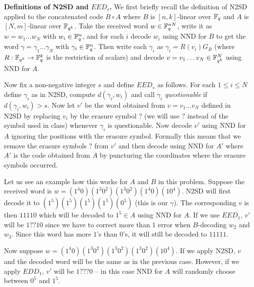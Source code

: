 \documentclass[12pt]{amsart}
\begin{document}
{\bf Definitions of N2SD and $EED_s$.} We first briefly recall the definition of N2SD applied to the concatenated code $B\circ A$ where $B$ is $[n,k]$-linear over ${\mathbb F}_q$
and $A$ is $[N,m]$-linear over ${\mathbb F}_{q^k}$. Take the received word $w\in {\mathbb F}_{q}^{nN}$, write it as $w=w_1\ldots w_N$ with 
$w_i\in {\mathbb F}_{q}^{n}$, and for each $i$ decode $w_i$ using NND for $B$ to get the word $\gamma=\gamma_1\ldots\gamma_N$
with $\gamma_i\in {\mathbb F}_{q}^{n}$. Then write each $\gamma_i$ as $\gamma_i=R(v_i)G_B$ (where $R:{\mathbb F}_{q^k}\to {\mathbb F}_{q}^k$ is the restriction of scalars) and decode $v=v_1\ldots v_N\in {\mathbb F}_{q^k}^N$ using NND for $A$.
\skv

Now fix a non-negative integer $s$ and define $EED_s$ as follows. For each $1\leq i\leq N$ define $\gamma_i$ as in N2SD,
compute $d(\gamma_i,w_i)$ and call $\gamma_i$ {\it questionable} if $d(\gamma_i,w_i)>s$. Now let $v'$ be the word obtained
from $v=v_1\ldots v_N$ defined in N2SD by replacing $v_i$ by the erasure symbol $?$ (we will use $?$ instead of the symbol used in class) whenever $\gamma_i$ is questionable. Now decode $v'$ using NND for $A$ ignoring the positions with the erasure symbol. Formally this means that we remove the erasure symbols $?$ from $v'$ and then decode using NND for $A'$ where $A'$ is the code
obtained from $A$ by puncturing the coordinates where the erasure symbols occurred.
\skv

Let us see an example how this works for $A$ and $B$ in this problem. Suppose the received word is 
$w=(1^4 0)(1^3 0^2)(1^3 0^2)(1^4 0)(1 0^4)$. N2SD will first decode it to $(1^5)(1^5)(1^5)(1^5)(0^5)$ (this is our $\gamma$).
The corresponding $v$ is then $11110$ which will be decoded to $1^5\in A$ using NND for $A$. If we use $EED_1$,
$v'$ will be $1??10$ since we have to correct more than $1$ error when $B$-decoding $w_2$ and $w_3$. Since
this word has more $1$'s than $0$'s, it will still be decoded to $11111$.

Now suppose $w=(1^4 0)(1^3 0^2)(1^3 0^2)(1^3 0^2)(1 0^4)$. If we apply N2SD, $v$ and the decoded word will be the same as in the
previous case. However, if we apply $EDD_1$, $v'$ will be $1???0$ -- in this case NND for $A$ will randomly choose between
$0^5$ and $1^5$.
\end{document}
